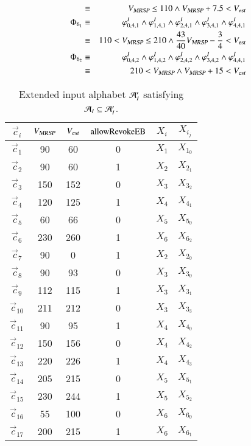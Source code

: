 \begin{example}
\begin{eqnarray*}
\\ & \equiv & {V_{\text{\sl MRSP}}} \le 110 \wedge {V_{\text{\sl MRSP}}} + 7.5 < {V_{\text{\sl est}}} 
\\
\Phi_{6_1} & \equiv &  \varphi_{0,4,1}^I \wedge \varphi_{1,4,1}^I \wedge \varphi_{2,4,1}^I \wedge  \varphi_{3,4,1}^I \wedge \varphi_{4,4,1}^I 
\\ & \equiv & 110<{V_{\text{\sl MRSP}}} \le 210 \wedge  \frac{43}{40}{V_{\text{\sl MRSP}}} -\frac{3}{4}< {V_{\text{\sl est}}} 
\\
\Phi_{6_2} & \equiv &  \varphi_{0,4,2}^I \wedge \varphi_{1,4,2}^I \wedge \varphi_{2,4,2}^I \wedge  \varphi_{3,4,2}^I \wedge \varphi_{4,4,1}^I 
\\ & \equiv & 210<{V_{\text{\sl MRSP}}}   \wedge {V_{\text{\sl MRSP}}} +15 < {V_{\text{\sl est}}} 
\end{eqnarray*}

\begin{table}[htdp]
\caption{Extended input alphabet ${{\cal A}}'_I$ satisfying  ${\cal A}_I\subseteq {{\cal A}}'_I$.}
\begin{center}
\begin{tabular}{|c||c|c|c||c|c|}
\hline\hline
$\vec c_i$&${V_{\text{\sl MRSP}}}$&${V_{\text{\sl est}}}$&$\text{allowRevokeEB}$&$X_i$ & $X_{i_j}$ \\\hline\hline
$\vec c_1$&90&60&0&$X_1$&$X_{1_0}$ \\
$\vec c_2$&90&60&1&$ X_2$ &$X_{2_1}$ \\
$\vec c_3$&150&152&0&$X_3$ &$X_{3_2}$ \\
$\vec c_4$&120&125&1&$X_4$&$X_{4_1}$ \\
$\vec c_{5}$&60&66&0&$X_5$&$X_{5_0}$ \\
$\vec c_{6}$&230&260&1&$X_6$&$X_{6_2}$\\\hline
% 
$\vec c_{7}$&90&0&1& $ X_2$  &$X_{2_0}$ \\
%
$\vec c_{8}$&90&93&0&$X_3$ &$X_{3_0}$ \\
$\vec c_{9}$&112&115&1&$X_3$&$X_{3_1}$ \\
$\vec c_{10}$&211&212&0&$X_3$ &$X_{3_3}$ \\
%
$\vec c_{11}$&90&95&1&$X_4$&$X_{4_0}$ \\
$\vec c_{12}$&150&156&0&$X_4$&$X_{4_2}$ \\
$\vec c_{13}$&220&226&1&$X_4$&$X_{4_3}$ \\
%
$\vec c_{14}$&205&215&0&$X_5$&$X_{5_1}$ \\
$\vec c_{15}$&230&244&1&$X_5$&$X_{5_2}$ \\
%
$\vec c_{16}$&55&100&0&$X_6$&$X_{6_0}$ \\
$\vec c_{17}$&200&215&1&$X_6$&$X_{6_1}$ 
\\\hline\hline
\end{tabular}
\end{center}
\label{tab:inputalphabetreqref}
\end{table}


\end{example}
